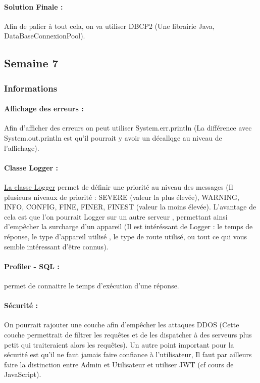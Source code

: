 \documentclass{article}[12pt]
\begin{document}
\paragraph{Solution Finale : } Afin de palier à tout cela, on va utiliser DBCP2 (Une librairie Java, DataBaseConnexionPool).
\subsection{Semaine 7}
\subsubsection{Informations}
\paragraph{Affichage des erreurs : } Afin d'afficher des erreurs on peut utiliser System.err.println (La différence avec System.out.println est qu'il pourrait y avoir un décallqge au niveau de l'affichage).
\paragraph{Classe Logger : }\href{https://docs.oracle.com/javase/8/docs/api/java/util/logging/Logger.html}{La classe Logger} permet de définir une priorité au niveau des messages (Il plusieurs niveaux de priorité : SEVERE (valeur la plus élevée), WARNING, INFO, CONFIG, FINE, FINER, FINEST (valeur la moins élevée). L'avantage de cela est que l'on pourrait Logger sur un autre serveur , permettant ainsi d'empêcher la surcharge d'un appareil (Il est intéréssant de Logger : le temps de réponse, le type d'appareil utilisé , le type de route utilisé, ou tout ce qui vous semble intéressant d'être connus). 
\paragraph{Profiler - SQL : } permet de connaitre le temps d'exécution d'une réponse.
\paragraph{Sécurité : } On pourrait rajouter une couche afin d'empêcher les attaques DDOS (Cette couche permettrait de filtrer les requêtes et de les dispatcher à des serveurs plus petit qui traiteraient alors les requêtes).  Un autre point important pour la sécurité est qu'il ne faut jamais faire confiance à l'utilisateur, Il faut par ailleurs faire la distinction entre Admin et Utilisateur et utiliser JWT (cf cours de JavaScript).
\end{document}
